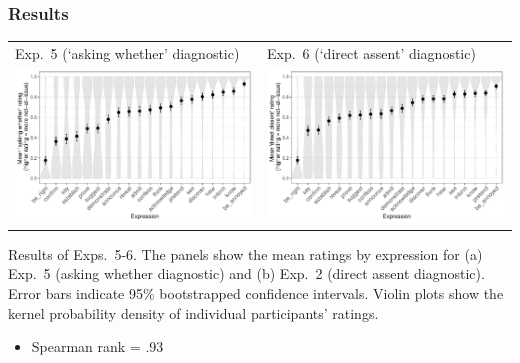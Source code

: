 \documentclass[compress, xcolor = dvipsnames, aspectratio=169]{beamer}
\begin{document}
	\begin{frame}[t]\frametitle{Results}\scriptsize

	      \centering
	      \begin{tabular}{p{.48\linewidth} p{.48\linewidth}}
	      	Exp.~5 (`asking whether' diagnostic)
	      	&
	      	Exp.~6 (`direct assent' diagnostic)\\ 
	      	\includegraphics[width=\linewidth]{../../results/exp5/graphs/mean-ratings.pdf}%
	      	&
	      	\includegraphics[width=\linewidth]{../../results/exp6/graphs/mean-ratings.pdf}
	      	\\
	      \end{tabular}

	      Results of Exps.~5-6. The panels show the mean ratings by expression for (a) Exp.~5 (asking whether diagnostic) and (b) Exp.~2 (direct assent diagnostic). Error bars indicate 95\% bootstrapped confidence intervals. Violin plots show the kernel probability density of individual participants' ratings.

	      \begin{itemize}
	      	\item Spearman rank = .93
	      \end{itemize}
	
	\end{frame}
\end{document}
